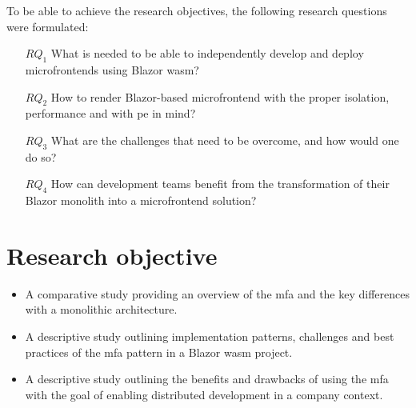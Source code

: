 
To be able to achieve the research objectives, the following research questions
were formulated:

\begin{itemize}
  \item[$RQ_1$] What is needed to be able to independently develop and deploy
  microfrontends using Blazor \gls{wasm}?
  \item[$RQ_2$] How to render Blazor-based \gls{microfrontend} with the proper
  isolation, performance and with \gls{pe} in mind?
  \item[$RQ_3$] What are the challenges that need to be overcome, and how would
  one do so? 
  \item[$RQ_4$] How can development teams benefit from the transformation of
  their Blazor \gls{monolith} into a \gls{microfrontend} solution?
\end{itemize}

\section{Research objective}
\label{sec:research-objective}


\begin{itemize}
  \item A comparative study providing an overview of the \gls{mfa} and the key
  differences with a \gls{monolithic} architecture.
  \item A descriptive study outlining implementation patterns, challenges and
  best practices of the \gls{mfa} pattern in a Blazor \gls{wasm} project.
  \item A descriptive study outlining the benefits and drawbacks of using the
  \gls{mfa} with the goal of enabling distributed development in a company
  context.
\end{itemize}

